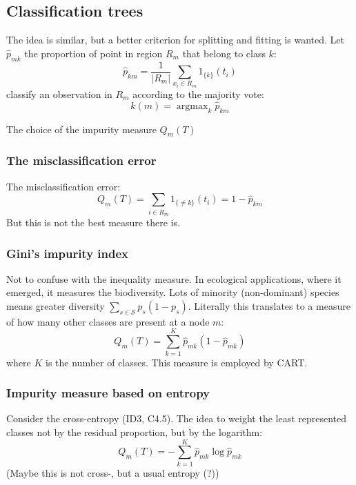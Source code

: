 \documentclass[a4paper]{article}
\newcommand{\argmax}{\mathop{\text{argmax}}}
\begin{document}

\subsection{Classification trees} %
\label{sub:classification_trees}

The idea is similar, but a better criterion for splitting and fitting is wanted.
Let $\hat{p}_{mk}$ the proportion of point in region $R_m$ that belong to class $k$:
\[\hat{p}_{km} = \frac{1}{|R_m|} \sum_{x_i\in R_m} 1_{\{k\}}(t_i) \]
classify an observation in $R_m$ according to the majority vote:
\[k(m) = \argmax_k \hat{p}_{km}\]

The choice of the impurity measure $Q_m(T)$
\subsubsection{The misclassification error} %
\label{ssub:the_misclassification_error}

The misclassification error:
\[
Q_m(T)
= \sum_{i \in R_m} 1_{\{\neq k\}}(t_i)
= 1 - \hat{p}_{km}
\]
But this is not the best measure there is.

\subsubsection{Gini's impurity index} %
\label{ssub:gini_s_impurity_index}

Not to confuse with the inequality measure. In ecological applications, where it
emerged, it measures the biodiversity. Lots of minority (non-dominant) species means
greater diversity $\sum_{s\in\mathcal{S}} p_s (1-p_s)$. Literally this translates to a measure
of how many other classes are present at a node $m$:
\[Q_m(T) = \sum_{k=1}^K\hat{p}_{mk}(1-\hat{p}_{mk})\]
where $K$ is the number of classes. This measure is employed by CART.


\subsubsection{Impurity measure based on entropy} %
\label{ssub:impurity_measure_based_on_entropy}

Consider the cross-entropy (ID3, C4.5). The idea to weight the least represented
classes not by the residual proportion, but by the logarithm:
\[Q_m(T) = -\sum_{k=1}^K\hat{p}_{mk} \log \hat{p}_{mk}\]
(Maybe this is not cross-, but a usual entropy (?))
\end{document}

